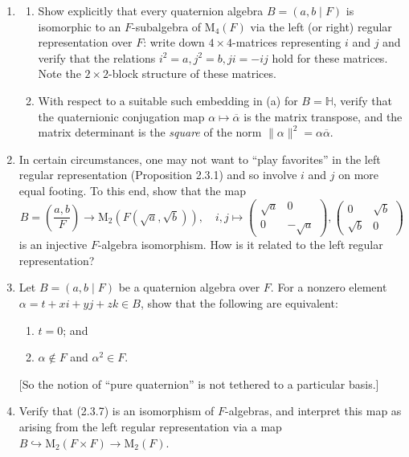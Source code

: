 \documentclass{article}
\theoremstyle{definition}
\begin{document}
\begin{enumerate}
\item \begin{enumerate}[label=(\alph*)]
\item Show explicitly that every quaternion algebra $B = (a, b \mid F)$ is isomorphic to an $F$-subalgebra of $\mathrm{M}_4(F)$ via the left (or right) regular representation over $F$: write down $4 \times 4$-matrices representing $i$ and $j$ and verify that the relations $i^2 = a, j^2 = b, ji = -ij$ hold for these matrices. Note the $2 \times 2$-block structure of these matrices.
\item With respect to a suitable such embedding in (a) for $B = \mathbb{H}$, verify that the quaternionic conjugation map $\alpha \mapsto \overline{\alpha}$ is the matrix transpose, and the matrix determinant is the \emph{square} of the norm $\|\alpha\|^2 = \alpha \overline{\alpha}$.
\end{enumerate}

\item In certain circumstances, one may not want to ``play favorites'' in the left regular representation (Proposition 2.3.1) and so involve $i$ and $j$ on more equal footing. To this end, show that the map
\begin{equation}
B = \left(\frac{a, b}{F}\right) \rightarrow \mathrm{M}_2(F(\sqrt{a}, \sqrt{b})), \quad
i, j \mapsto \begin{pmatrix} \sqrt{a} & 0 \\ 0 & -\sqrt{a} \end{pmatrix}, \begin{pmatrix} 0 & \sqrt{b} \\ \sqrt{b} & 0 \end{pmatrix} \tag{2.4.25}
\end{equation}
is an injective $F$-algebra isomorphism. How is it related to the left regular representation?

\item Let $B = (a, b \mid F)$ be a quaternion algebra over $F$. For a nonzero element $\alpha = t + xi + yj + zk \in B$, show that the following are equivalent:
\begin{enumerate}[label=(\roman*)]
\item $t = 0$; and
\item $\alpha \notin F$ and $\alpha^2 \in F$.
\end{enumerate}
[So the notion of ``pure quaternion'' is not tethered to a particular basis.]

\item Verify that (2.3.7) is an isomorphism of $F$-algebras, and interpret this map as arising from the left regular representation via a map $B \hookrightarrow \mathrm{M}_2(F \times F) \rightarrow \mathrm{M}_2(F)$.


\end{enumerate}
\end{document}
